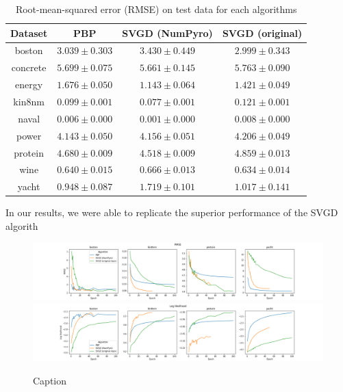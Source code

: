 \begin{table}[]
    \centering
\begin{tabular}{|c|ccc|}
\hline
 Dataset & PBP & SVGD (NumPyro) & SVGD (original)  \\
 \hline
boston & $3.039 \pm 0.303$ & $3.430 \pm 0.449$ & $2.999 \pm 0.343$ \\
concrete & $5.699 \pm 0.075$ & $5.661 \pm 0.145$ & $5.763 \pm 0.090$ \\
energy & $1.676 \pm 0.050$ & $1.143 \pm 0.064$ & $1.421 \pm 0.049$ \\
kin8nm & $0.099 \pm 0.001$ & $0.077 \pm 0.001$ & $0.121 \pm 0.001$ \\
naval & $0.006 \pm 0.000$ & $0.001 \pm 0.000$ & $0.008 \pm 0.000$ \\
power & $4.143 \pm 0.050$ & $4.156 \pm 0.051$ & $4.206 \pm 0.049$ \\
protein & $4.680 \pm 0.009$ & $4.518 \pm 0.009$ & $4.859 \pm 0.013$ \\
wine & $0.640 \pm 0.015$ & $0.666 \pm 0.013$ & $0.634 \pm 0.014$ \\
yacht & $0.948 \pm 0.087$ & $1.719 \pm 0.101$ & $1.017 \pm 0.141$ \\
\hline
\end{tabular}
    \caption{Root-mean-squared error (RMSE) on test data for each algorithms} 
    \label{tab:bnn_rmse}
\end{table}

In our results, we were able to replicate the superior performance of the SVGD algorith

\begin{figure}[h]
    \centering
    \includegraphics[width=\textwidth]{figs/bayesian_epoch_RMSE.png}
    \includegraphics[width=\textwidth]{figs/bayesian_epoch_Loglikelihood.png}
    \caption{Caption}
    \label{fig:my_label}
\end{figure}